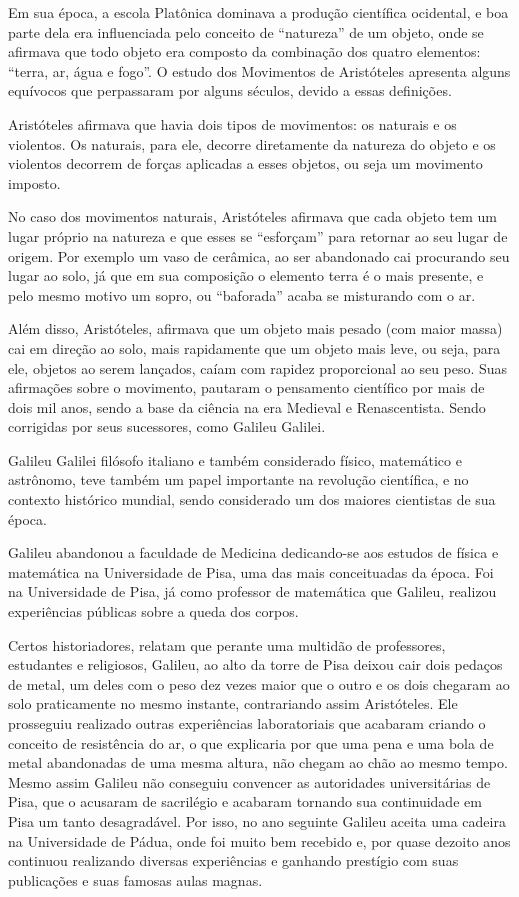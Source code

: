 Em sua época, a escola Platônica dominava a produção científica ocidental, e boa parte dela era influenciada pelo conceito de “natureza” de um objeto, onde se afirmava que todo objeto era composto da combinação dos quatro elementos: “terra, ar, água e fogo”. O estudo dos Movimentos de Aristóteles apresenta alguns equívocos que perpassaram por alguns séculos, devido a essas definições.

Aristóteles afirmava que havia dois tipos de movimentos: os naturais e os violentos. Os naturais, para ele, decorre diretamente da natureza do objeto e os violentos decorrem de  forças aplicadas a esses objetos, ou seja um movimento imposto.

No caso dos movimentos naturais, Aristóteles afirmava que cada objeto tem um lugar próprio na natureza e que esses se “esforçam” para retornar ao seu lugar de origem. Por exemplo um vaso de cerâmica, ao ser abandonado cai procurando seu lugar ao solo, já que em sua composição o elemento terra é o mais presente, e pelo mesmo motivo um sopro, ou “baforada” acaba se misturando com o ar.

Além disso, Aristóteles, afirmava que um objeto mais pesado (com maior massa) cai em direção ao solo, mais rapidamente que um objeto mais leve, ou seja, para ele, objetos ao serem lançados, caíam com rapidez proporcional ao seu peso. Suas afirmações sobre o movimento, pautaram o pensamento científico por mais de dois mil anos, sendo a base da ciência na era Medieval e Renascentista. Sendo corrigidas por seus sucessores, como Galileu Galilei.

Galileu Galilei filósofo italiano e também considerado físico, matemático e astrônomo, teve também um papel importante na revolução científica, e no contexto histórico mundial, sendo considerado um dos maiores cientistas de sua época.

Galileu abandonou a faculdade de Medicina dedicando-se aos estudos de física e matemática na Universidade de Pisa, uma das mais conceituadas da época. Foi na Universidade de Pisa, já como professor de matemática que Galileu, realizou experiências públicas sobre a queda dos corpos.

Certos historiadores, relatam que perante uma multidão de professores, estudantes e religiosos, Galileu, ao alto da torre de Pisa deixou cair dois pedaços de metal, um deles com o peso dez vezes maior que o outro e os dois chegaram ao solo praticamente no mesmo instante, contrariando assim Aristóteles. Ele prosseguiu realizado outras experiências laboratoriais que acabaram criando o conceito de resistência do ar, o que explicaria por que uma pena e uma bola de metal abandonadas de uma mesma altura, não chegam ao chão ao mesmo tempo. Mesmo assim Galileu não conseguiu convencer as autoridades universitárias de Pisa, que o acusaram de sacrilégio e acabaram tornando sua continuidade em Pisa um tanto desagradável. Por isso, no ano seguinte Galileu aceita uma cadeira na Universidade de Pádua, onde foi muito bem recebido e, por quase dezoito anos continuou realizando diversas experiências e ganhando prestígio com suas publicações e suas famosas aulas magnas.

